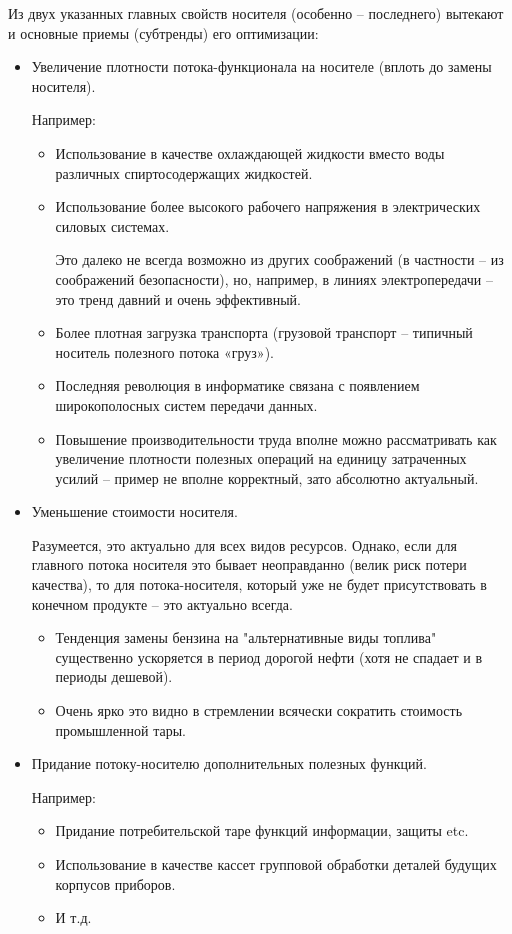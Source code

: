 \documentclass[a4paper,11pt]{article}
\begin{document}
Из двух указанных главных свойств носителя (особенно -- последнего) вытекают и
основные приемы (субтренды) его оптимизации:
\begin{itemize}
\item Увеличение плотности потока-функционала на носителе (вплоть до замены
  носителя).

  Например:
  \begin{itemize}
  \item Использование в качестве охлаждающей жидкости вместо воды различных
    спиртосодержащих жидкостей.
  \item Использование более высокого рабочего напряжения в электрических
    силовых системах.

    Это далеко не всегда возможно из других соображений (в частности -- из
    соображений безопасности), но, например, в линиях электропередачи -- это
    тренд давний и очень эффективный.
  \item Более плотная загрузка транспорта (грузовой транспорт -- типичный
    носитель полезного потока «груз»).
  \item Последняя революция в информатике связана с появлением широкополосных
    систем передачи данных.
  \item Повышение производительности труда вполне можно рассматривать как
    увеличение плотности полезных операций на единицу затраченных усилий --
    пример не вполне корректный, зато абсолютно актуальный.
  \end{itemize}
\item Уменьшение стоимости носителя.

  Разумеется, это актуально для всех видов ресурсов. Однако, если для главного
  потока носителя это бывает неоправданно (велик риск потери качества), то для
  потока-носителя, который уже не будет присутствовать в конечном продукте --
  это актуально всегда.
  \begin{itemize}
  \item Тенденция замены бензина на "альтернативные виды топлива" существенно
    ускоряется в период дорогой нефти (хотя не спадает и в периоды дешевой).
  \item Очень ярко это видно в стремлении всячески сократить стоимость
    промышленной тары.
  \end{itemize}
\item Придание потоку-носителю дополнительных полезных функций.

  Например:
  \begin{itemize}
  \item Придание потребительской таре функций информации, защиты etc.
  \item Использование в качестве кассет групповой обработки деталей будущих
    корпусов приборов.
  \item И т.д.
  \end{itemize}
\end{itemize}
\end{document}
